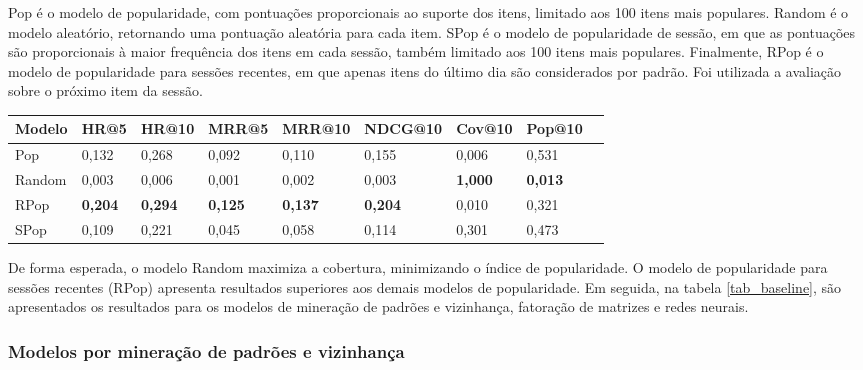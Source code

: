   Pop é o modelo de popularidade, com pontuações proporcionais ao suporte dos
  itens, limitado aos 100 itens mais populares. Random é o modelo aleatório,
  retornando uma pontuação aleatória para cada item. SPop é o modelo de
  popularidade de sessão, em que as pontuações são proporcionais à maior
  frequência dos itens em cada sessão, também limitado aos 100 itens mais
  populares. Finalmente, RPop é o modelo de popularidade para sessões recentes,
  em que apenas itens do último dia são considerados por padrão. Foi utilizada a
  avaliação sobre o próximo item da sessão.
\begin{table}[htbp]
  \centering
  \begin{tabular}
    {|l|l|l|l|l|l|l|l|l|}
    \hline
    Modelo & HR@5 & HR@10 & MRR@5 & MRR@10 & NDCG@10 & Cov@10 & Pop@10 \\ \hline
    Pop & 0,132 & 0,268 & 0,092 & 0,110 & 0,155 & 0,006 & 0,531 \\ \hline
    Random & 0,003 & 0,006 & 0,001 & 0,002 & 0,003 & \textbf{1,000} & \textbf{0,013} \\ \hline
    RPop & \textbf{0,204} & \textbf{0,294} & \textbf{0,125} & \textbf{0,137} & \textbf{0,204} & 0,010 & 0,321 \\ \hline
    SPop & 0,109 & 0,221 & 0,045 & 0,058 & 0,114 & 0,301 & 0,473 \\ \hline
  \end{tabular}
\end{table}

De forma esperada, o modelo Random maximiza a cobertura, minimizando o índice de
popularidade. O modelo de popularidade para sessões recentes (RPop) apresenta
resultados superiores aos demais modelos de popularidade.
Em seguida, na tabela \ref{tab_baseline}, são apresentados os resultados para os
modelos de mineração de padrões e vizinhança, fatoração de matrizes e redes neurais.


\subsubsection{Modelos por mineração de padrões e vizinhança}

